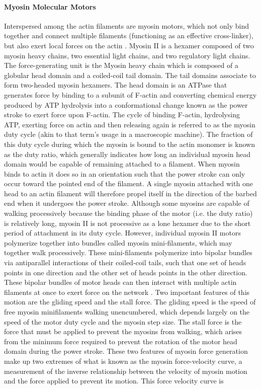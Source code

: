 \paragraph{Myosin Molecular Motors} Interspersed among the actin filaments are myosin motors, which not only bind together and connect multiple filaments (functioning as an effective cross-linker), but also exert local forces on the actin \cite{howard2001mechanics}.  Myosin II is a hexamer composed of two myosin heavy chains, two essential light chains, and two regulatory light chains. The force-generating unit is the Myosin heavy chain which is composed of a globular head domain and a coiled-coil tail domain.  The tail domains associate to form two-headed myosin hexamers. The head domain is an ATPase that  generates force by binding to a subunit of F-actin and converting chemical energy produced by ATP hydrolysis into a conformational change known as the power stroke to exert force upon F-actin. The cycle of binding F-actin, hydrolysing ATP, exerting force on actin and then releasing again is referred to as the myosin duty cycle (akin to that term’s usage in a macroscopic machine)\cite{howard2001mechanics}.  The fraction of this duty cycle during which the myosin is bound to the actin monomer is known as the duty ratio, which generally indicates how long an individual myosin head domain would be capable of remaining attached to a filament. When myosin binds to actin it does so in an orientation such that the power stroke can only occur toward the pointed end of the filament\cite{howard2001mechanics}. A single myosin attached with one head to an actin filament will therefore propel itself in the direction of the barbed end when it undergoes the power stroke. Although some myosins are capable of walking processively because the binding phase of the motor (i.e. the duty ratio) is relatively long, myosin II is not processive as a lone hexamer due to the short period of attachment in its duty cycle\cite{howard2001mechanics}.  However, individual myosin II motors polymerize together into bundles called myosin mini-filaments\cite{egelhoff93}, which may together walk processively. These mini-filaments polymerize into bipolar bundles via antiparallel interactions of their coiled-coil tails, such that one set of heads points in one direction and the other set of heads points in the other direction. These bipolar bundles of motor heads can then interact with multiple actin filaments at once to exert force on the network \cite{Bing2000}. Two important features of this motion are the gliding speed and the stall force. The gliding speed is the speed of free myosin minifilaments walking unencumbered, which depends largely on the speed of the motor duty cycle and the myosin step size.  The stall force is the force that must be applied to prevent the myosins from walking, which arises from the minimum force required to prevent the rotation of the motor head domain during the power stroke\cite{Bing2000}.  These two features of myosin force generation make up two extremes of what is known as the myosin force-velocity curve, a measurement of the inverse relationship between the velocity of myosin motion and the force applied to prevent its motion.  This force velocity curve is 